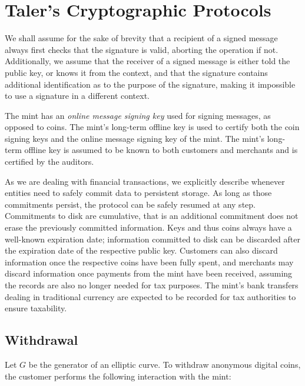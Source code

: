 \documentclass{llncs}
\begin{document}
\section{Taler's Cryptographic Protocols}


We shall assume for the sake of brevity that a recipient of a signed 
message always first checks that the signature is valid, aborting the
operation if not.  Additionally, we assume that the receiver of a
signed message is either told the public key, or knows it from the
context, and that the signature contains additional identification as
to the purpose of the signature, making it impossible to use a signature
in a different context.

The mint has an {\em online message signing key} used for signing 
messages, as opposed to coins.  The mint's long-term offline key is used
to certify both the coin signing keys and the online message signing key
of the mint.  The mint's long-term offline key is assumed to be known to
both customers and merchants and is certified by the auditors.

As we are dealing with financial transactions, we explicitly describe
whenever entities need to safely commit data to persistent storage.
As long as those commitments persist, the protocol can be safely
resumed at any step.  Commitments to disk are cumulative, that is an
additional commitment does not erase the previously committed
information.  Keys and thus coins always have a well-known expiration
date; information committed to disk can be discarded after the
expiration date of the respective public key.  Customers can also
discard information once the respective coins have been fully spent,
and merchants may discard information once payments from the mint have
been received, assuming the records are also no longer needed for tax
purposes.  The mint's bank transfers dealing in traditional currency
are expected to be recorded for tax authorities to ensure taxability.

\subsection{Withdrawal}

Let $G$ be the generator of an elliptic curve.  To withdraw anonymous
digital coins, the customer performs the following interaction with
the mint:
\end{document}
